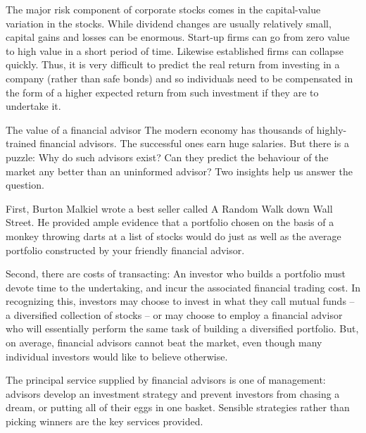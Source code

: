 The major risk component of corporate stocks comes in the capital-value variation in the stocks. While dividend changes are usually relatively small, capital gains and losses can be enormous. Start-up firms can go from zero value to high value in a short period of time. Likewise established firms can collapse quickly. Thus, it is very difficult to predict the real return from investing in a company (rather than safe bonds) and so individuals need to be compensated in the form of a higher expected return from such investment if they are to undertake it.

\begin{ApplicationBox}{The value of a financial advisor \label{app:finadvisor}}
The modern economy has thousands of highly-trained financial advisors. The successful ones earn huge salaries. But there is a puzzle: Why do such advisors exist? Can they predict the behaviour of the market any better than an uninformed advisor? Two insights help us answer the question.

\bigskip
First, Burton Malkiel wrote a best seller called A Random Walk down Wall Street. He provided ample evidence that a portfolio chosen on the basis of a monkey throwing darts at a list of stocks would do just as well as the average portfolio constructed by your friendly financial advisor.

\bigskip
Second, there are costs of transacting: An investor who builds a portfolio must devote time to the undertaking, and incur the associated financial trading cost. In recognizing this, investors may choose to invest in what they call mutual funds -- a diversified collection of stocks -- or may choose to employ a financial advisor who will essentially perform the same task of building a diversified portfolio. But, on average, financial advisors cannot beat the market, even though many individual investors would like to believe otherwise.

\bigskip
The principal service supplied by financial advisors is one of management: advisors develop an investment strategy and prevent investors from chasing a dream, or putting all of their eggs in one basket. Sensible strategies rather than picking winners are the key services provided.
\end{ApplicationBox}